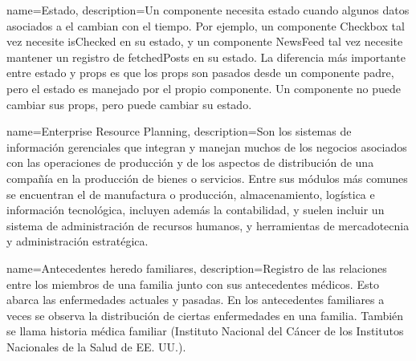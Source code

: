 {
    name=Estado,
    description={Un componente necesita estado cuando algunos datos asociados a el cambian con el tiempo. Por ejemplo, un componente Checkbox tal vez necesite isChecked en su estado, y un componente NewsFeed tal vez necesite mantener un registro de fetchedPosts en su estado. La diferencia más importante entre estado y props es que los props son pasados desde un componente padre, pero el estado es manejado por el propio componente. Un componente no puede cambiar sus props, pero puede cambiar su estado.
  }
}


{
    name=Enterprise Resource Planning,
    description={Son los sistemas de información gerenciales que integran y manejan muchos de los negocios asociados con las operaciones de producción y de los aspectos de distribución de una compañía en la producción de bienes o servicios. Entre sus módulos más comunes se encuentran el de manufactura o producción, almacenamiento, logística e información tecnológica, incluyen además la contabilidad, y suelen incluir un sistema de administración de recursos humanos, y herramientas de mercadotecnia y administración estratégica.
  }
}

{
    name=Antecedentes heredo familiares,
    description={Registro de las relaciones entre los miembros de una familia junto con sus antecedentes médicos. Esto abarca las enfermedades actuales y pasadas. En los antecedentes familiares a veces se observa la distribución de ciertas enfermedades en una familia. También se llama historia médica familiar (Instituto Nacional del Cáncer de los Institutos Nacionales de la Salud de EE. UU.). 
  }
}














